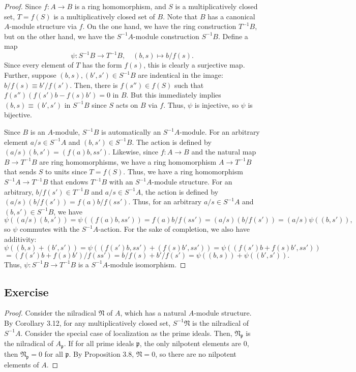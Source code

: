 \begin{proof}
Since $f : A \to B$ is a ring homomorphism, and $S$ is a multiplicatively closed set, $T = f(S)$ is a multiplicatively closed set of $B$. Note that $B$ has a canonical $A$-module
structure via $f$. On the one hand, we have the ring construction $T^{-1}B$, but on the other hand, we have the $S^{-1}A$-module construction $S^{-1}B$. Define a map
$$\psi : S^{-1}B \to T^{-1}B, \quad (b,s) \mapsto b/f(s).$$
Since every element of $T$ has the form $f(s)$, this is clearly a surjective map. Further, suppose $(b,s), (b',s') \in S^{-1}B$ are indentical in the image: $b/f(s) \equiv b'/f(s')$. Then, there is $f(s'') \in f(S)$
such that $f(s'')(f(s')b - f(s)b') = 0$ in $B$. But this immediately implies $(b,s) \equiv (b',s')$ in $S^{-1}B$ since $S$ acts on $B$ via $f$. Thus, $\psi$ is injective, so $\psi$ is bijective.

Since $B$ is an $A$-module, $S^{-1}B$ is automatically an $S^{-1}A$-module. For an arbitrary element $a/s \in S^{-1}A$ and $(b,s') \in S^{-1}B$. The action is defined by $(a/s)(b,s') = (f(a)b, ss')$.
Likewise, since $f : A \to B$ and the natural map $B \to T^{-1}B$ are ring homomorphisms, we have a ring homomorphism $A \to T^{-1}B$ that sends $S$ to units since $T = f(S)$. Thus, we have a ring homomorphism
$S^{-1}A \to T^{-1}B$ that endows $T^{-1}B$ with an $S^{-1}A$-module structure. For an arbitrary, $b/f(s') \in T^{-1}B$ and $a/s \in S^{-1}A$, the action is defined by $(a/s)(b/f(s')) = f(a)b/f(ss')$. Thus, for
an arbitrary $a/s \in S^{-1}A$ and $(b,s') \in S^{-1}B$, we have
$$\psi((a/s)(b,s')) = \psi((f(a)b,ss')) = f(a)b/f(ss') = (a/s)(b/f(s')) = (a/s)\psi((b,s')),$$
so $\psi$ commutes with the $S^{-1}A$-action. For the sake of completion, we also have additivity:
$$\psi((b,s) + (b',s')) = \psi((f(s')b,ss') + (f(s)b',ss')) = \psi((f(s')b + f(s)b', ss'))$$ 
$$= (f(s')b + f(s)b')/f(ss') = b/f(s) + b'/f(s') = \psi((b,s)) + \psi((b',s')).$$
Thus, $\psi : S^{-1}B \to T^{-1}B$ is a $S^{-1}A$-module isomorphism.
\end{proof}

\subsection{Exercise}\label{3.5}

\begin{proof}
Consider the nilradical $\mathfrak{N}$ of $A$, which has a natural $A$-module structure. By Corollary 3.12, for any multiplicatively closed set, $S^{-1}\mathfrak{N}$ is the
nilradical of $S^{-1}A$. Consider the special case of localization as the prime ideals. Then, $\mathfrak{N}_{\mathfrak{p}}$ is the nilradical of $A_\mathfrak{p}$. If for all
prime ideals $\mathfrak{p}$, the only nilpotent elements are $0$, then $\mathfrak{N}_{\mathfrak{p}} = 0$ for all $\mathfrak{p}$. By Proposition 3.8, $\mathfrak{N} = 0$, so there
are no nilpotent elements of $A$.
\end{proof}

